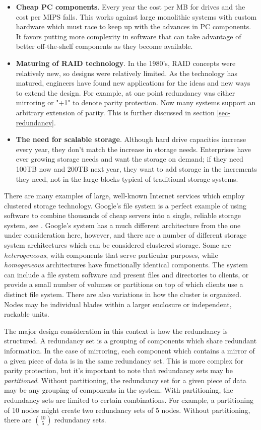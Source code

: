 \documentclass[11pt]{article}
\numberwithin{equation}{section}
\begin{document}
\begin{itemize}
\item[] {\bf Cheap PC components}.  Every year the cost per MB for drives and
the cost per MIPS falls.  This works against large monolithic systems with
custom hardware which must race to keep up with the advances in PC components.
It favors putting more complexity in software that can take advantage of
better off-the-shelf components as they become available.

\item[] {\bf Maturing of RAID technology}. In the 1980's, RAID concepts were
relatively new, so designs were relatively limited.  As the technology has
matured, engineers have found new applications for the ideas and new ways to
extend the design.  For example, at one point redundancy was either mirroring
or "+1" to denote parity protection.  Now many systems support an arbitrary
extension of parity.  This is further discussed in section \ref{sec-redundancy}.

\item[] {\bf The need for scalable storage}. Although hard drive capacities
increase every year, they don't match the increase in storage needs.
Enterprises have ever growing storage needs and want the storage on demand;
if they need 100TB now and 200TB next year, they want to add storage in the
increments they need, not in the large blocks typical of traditional storage
systems. 
\end{itemize}

There are many examples of large, well-known Internet services which employ
clustered storage technology.  Google's file system is a perfect example of
using software to combine thousands of cheap servers into a single, reliable
storage system, see \cite{google}.  Google's system has a much different
architecture from the one under consideration here, however, and there are a
number of different storage system architectures which can be considered
clustered storage.  Some are {\em heterogeneous}, with components that serve
particular purposes, while {\em homogeneous} architectures have functionally
identical components.  The system can include a file system software and
present files and directories to clients, or provide a small number of
volumes or partitions on top of which clients use a distinct file system.
There are also variations in how the cluster is organized.  Nodes may be
individual blades within a larger enclosure or independent, rackable units.

The major design consideration in this context is how the redundancy is
structured.  A redundancy set is a grouping of components which share
redundant information.  In the case of mirroring, each component which
contains a mirror of a given piece of data is in the same redundancy set.
This is more complex for parity protection, but it's important to note that
redundancy sets may be {\em partitioned}.  Without partitioning, the
redundancy set for a given piece of data may be any grouping of components in
the system.  With partitioning, the redundancy sets are limited to certain
combinations.  For example, a partitioning of 10 nodes might create two
redundancy sets of 5 nodes.  Without partitioning, there are ${10 \choose 5}$
redundancy sets.
\end{document}

